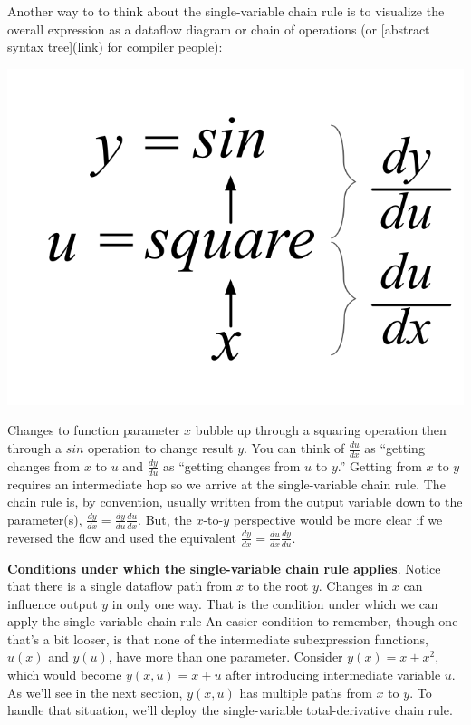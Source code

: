 \documentclass[11pt]{article}
\begin{document}
Another way to to think about the single-variable chain rule is to visualize the overall expression as a dataflow diagram or chain of operations (or [abstract syntax tree](link) for compiler people):

\includegraphics[scale=.9]{sin-square.png}

Changes to function parameter $x$ bubble up through a squaring operation then through a $sin$ operation to change result $y$. You can think of $\frac{du}{dx}$ as ``getting changes from $x$ to $u$ and $\frac{dy}{du}$ as ``getting changes from $u$ to $y$.'' Getting from $x$ to $y$ requires an intermediate hop so we arrive at the single-variable chain rule. The chain rule is, by convention, usually written from the output variable down to the parameter(s), $\frac{dy}{dx} = \frac{dy}{du} \frac{du}{dx}$. But, the $x$-to-$y$ perspective would be more clear if we reversed the flow and used the equivalent $\frac{dy}{dx} = \frac{du}{dx}\frac{dy}{du}$.

{\bf Conditions under which the single-variable chain rule applies}. Notice that there is a single dataflow path from $x$ to the root $y$.  Changes in $x$ can influence output $y$ in only one way.  That is the condition under which we can apply the single-variable chain rule An easier condition to remember, though one that's a bit looser, is that none of the intermediate subexpression functions, $u(x)$ and $y(u)$, have more than one parameter.  Consider $y(x) = x+x^2$, which would become $y(x,u) = x+u$ after introducing intermediate variable $u$.  As we'll see in the next section, $y(x,u)$ has multiple paths from $x$ to $y$. To handle that situation, we'll deploy the single-variable total-derivative chain rule.
	
\end{document}
